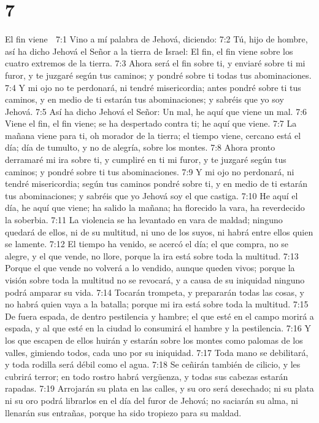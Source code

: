 \chapter{7}

El fin viene  

7:1 Vino a mí palabra de Jehová, diciendo:  
7:2 Tú, hijo de hombre, así ha dicho Jehová el Señor a la tierra de Israel: El fin, el fin viene sobre los cuatro extremos de la tierra.  
7:3 Ahora será el fin sobre ti, y enviaré sobre ti mi furor, y te juzgaré según tus caminos; y pondré sobre ti todas tus abominaciones.  
7:4 Y mi ojo no te perdonará, ni tendré misericordia; antes pondré sobre ti tus caminos, y en medio de ti estarán tus abominaciones; y sabréis que yo soy Jehová.  
7:5 Así ha dicho Jehová el Señor: Un mal, he aquí que viene un mal.  
7:6 Viene el fin, el fin viene; se ha despertado contra ti; he aquí que viene.  
7:7 La mañana viene para ti, oh morador de la tierra; el tiempo viene, cercano está el día; día de tumulto, y no de alegría, sobre los montes.  
7:8 Ahora pronto derramaré mi ira sobre ti, y cumpliré en ti mi furor, y te juzgaré según tus caminos; y pondré sobre ti tus abominaciones.  
7:9 Y mi ojo no perdonará, ni tendré misericordia; según tus caminos pondré sobre ti, y en medio de ti estarán tus abominaciones; y sabréis que yo Jehová soy el que castiga.  
7:10 He aquí el día, he aquí que viene; ha salido la mañana; ha florecido la vara, ha reverdecido la soberbia.  
7:11 La violencia se ha levantado en vara de maldad; ninguno quedará de ellos, ni de su multitud, ni uno de los suyos, ni habrá entre ellos quien se lamente.  
7:12 El tiempo ha venido, se acercó el día; el que compra, no se alegre, y el que vende, no llore, porque la ira está sobre toda la multitud.  
7:13 Porque el que vende no volverá a lo vendido, aunque queden vivos; porque la visión sobre toda la multitud no se revocará, y a causa de su iniquidad ninguno podrá amparar su vida.  
7:14 Tocarán trompeta, y prepararán todas las cosas, y no habrá quien vaya a la batalla; porque mi ira está sobre toda la multitud.  
7:15 De fuera espada, de dentro pestilencia y hambre; el que esté en el campo morirá a espada, y al que esté en la ciudad lo consumirá el hambre y la pestilencia.  
7:16 Y los que escapen de ellos huirán y estarán sobre los montes como palomas de los valles, gimiendo todos, cada uno por su iniquidad.  
7:17 Toda mano se debilitará, y toda rodilla será débil como el agua.  
7:18 Se ceñirán también de cilicio, y les cubrirá terror; en todo rostro habrá vergüenza, y todas sus cabezas estarán rapadas.  
7:19 Arrojarán su plata en las calles, y su oro será desechado; ni su plata ni su oro podrá librarlos en el día del furor de Jehová; no saciarán su alma, ni llenarán sus entrañas, porque ha sido tropiezo para su maldad.  
